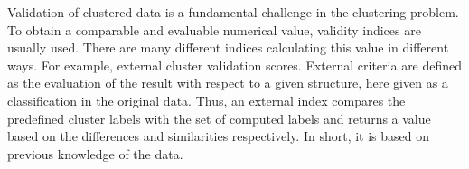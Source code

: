 Validation of clustered data is a fundamental challenge in the clustering problem. To obtain a comparable and evaluable numerical value, validity indices are usually used. There are many different indices calculating this value in different ways. For example, external cluster validation scores. External criteria are defined as the evaluation of the result with respect to a given structure, here given as a classification in the original data. Thus, an external index compares the predefined cluster labels with the set of computed labels and returns a value based on the differences and similarities respectively. In short, it is based on previous knowledge of the data. \cite{int_ext}